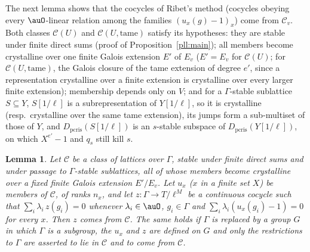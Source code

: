 \documentclass[10pt]{amsart}
\newtheorem{lemma}[theorem]{Lemma}
\theoremstyle{definition}
\theoremstyle{remark}
\begin{document}
The next lemma shows that the cocycles of Ribet's method (cocycles obeying every $\auO$-linear
relation among the families $(u_x(g)-1)_x$) come from $\mathcal C_v$. Both classes
$\mathcal C(U)$ and $\mathcal C(U,\mathrm{tame})$ satisfy its hypotheses: they are stable under
finite direct sums (proof of Proposition~\ref{pll:main}); all members become crystalline over one
finite Galois extension $E'$ of $E_v$ ($E'=E_v$ for $\mathcal C(U)$; for $\mathcal C(U,\mathrm{tame})$,
the Galois closure of the tame extension of degree $e'$, since a representation crystalline over a
finite extension is crystalline over every larger finite extension); membership depends only on $V$; and for
a $\Gamma$-stable sublattice $S\subseteq Y$, $S[1/\ell]$ is a subrepresentation of $Y[1/\ell]$, so
it is crystalline (resp.\ crystalline over the same tame extension), its jumps form a
sub-multiset of those of $Y$, and $D_{\mathrm{pcris}}(S[1/\ell])$ is an $s$-stable subspace of
$D_{\mathrm{pcris}}(Y[1/\ell])$, on which $X^{e'}-1$ and $q_s$ still kill $s$.

\begin{lemma}\label{pll:ribet}
Let $\mathcal C$ be a class of lattices over $\Gamma$, stable under finite direct sums and under
passage to $\Gamma$-stable sublattices, all of whose members become crystalline over a fixed finite
Galois extension $E'/E_v$. Let $u_x$ ($x$ in a finite set $X$) be members of $\mathcal C$, of ranks
$n_x$, and let $z\colon\Gamma\to T/\ell^M$ be a continuous cocycle such that $\sum_i\lambda_i\,
z(g_i)=0$ whenever $\lambda_i\in\auO$, $g_i\in\Gamma$ and $\sum_i\lambda_i(u_x(g_i)-1)=0$ for every
$x$. Then $z$ comes from $\mathcal C$. The same holds if $\Gamma$ is replaced by a group $G$ in which
$\Gamma$ is a subgroup, the $u_x$ and $z$ are defined on $G$ and only the restrictions to $\Gamma$
are asserted to lie in $\mathcal C$ and to come from $\mathcal C$.
\end{lemma}
\end{document}

